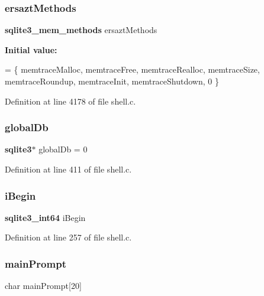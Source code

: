 \subsubsection{ersazt\+Methods}
{\footnotesize\ttfamily \textbf{ sqlite3\+\_\+mem\+\_\+methods} ersazt\+Methods\hspace{0.3cm}{\ttfamily [static]}}

{\bfseries Initial value\+:}
\begin{DoxyCode}
= \{
  memtraceMalloc,
  memtraceFree,
  memtraceRealloc,
  memtraceSize,
  memtraceRoundup,
  memtraceInit,
  memtraceShutdown,
  0
\}
\end{DoxyCode}


Definition at line 4178 of file shell.\+c.

\mbox{\label{shell_8c_ae09e723b834e949e20aadf34501e10c8}} 
\subsubsection{global\+Db}
{\footnotesize\ttfamily \textbf{ sqlite3}$\ast$ global\+Db = 0\hspace{0.3cm}{\ttfamily [static]}}



Definition at line 411 of file shell.\+c.

\mbox{\label{shell_8c_a6d71f0f74b48d086b34c24736c89a38d}} 
\subsubsection{i\+Begin}
{\footnotesize\ttfamily \textbf{ sqlite3\+\_\+int64} i\+Begin\hspace{0.3cm}{\ttfamily [static]}}



Definition at line 257 of file shell.\+c.

\mbox{\label{shell_8c_acff55a5111149c7b0e53349d1487ec59}} 
\subsubsection{main\+Prompt}
{\footnotesize\ttfamily char main\+Prompt[20]\hspace{0.3cm}{\ttfamily [static]}}



